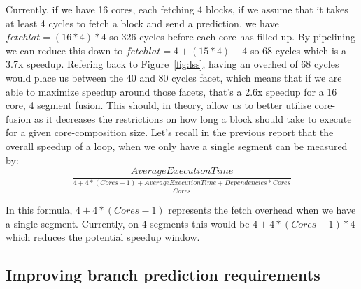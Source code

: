 Currently, if we have 16 cores, each fetching 4 blocks, if we assume that it takes at least 4 cycles to fetch a block and send a prediction, we have
$fetchlat=(16 * 4)*4$  so 326 cycles before each core has filled up.
By pipelining we can reduce this down to $fetchlat=4+(15*4)+4$  so 68 cycles which is a 3.7x speedup.
Refering back to Figure~\ref{fig:lss}, having an overhed of 68 cycles would place us between the 40 and 80 cycles facet, which means that if we are able to maximize speedup around those facets, that's a 2.6x speedup for a 16 core, 4 segment fusion.
This should, in theory, allow us to better utilise core-fusion as it decreases the restrictions on how long a block should take to execute for a given core-composition size.
Let's recall in the previous report that the overall speedup of a loop, when we only have a single segment can be measured by:
\begin{equation}\label{eq:avspeed}
\frac{Average Execution Time}{\frac{4+4*(Cores -1)+ Average Execution Time + Dependencies  * Cores}{ Cores}}
\end{equation}

In this formula, $4+4*(Cores-1)$ represents the fetch overhead when we have a single segment.
Currently, on 4 segments this would be $4+4*(Cores-1)*4$ which reduces the potential speedup window.

\subsection{Improving branch prediction requirements}

